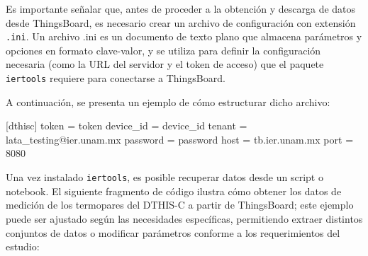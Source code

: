 \documentclass[
  letterpaper,
]{scrbook}
\newenvironment{Shaded}{\begin{snugshade}}{\end{snugshade}}
\newcommand{\DecValTok}[1]{\textcolor[rgb]{0.68,0.00,0.00}{#1}}
\newcommand{\NormalTok}[1]{\textcolor[rgb]{0.00,0.23,0.31}{#1}}
\newcommand{\OperatorTok}[1]{\textcolor[rgb]{0.37,0.37,0.37}{#1}}
\begin{document}
Es importante señalar que, antes de proceder a la obtención y descarga
de datos desde ThingsBoard, es necesario crear un archivo de
configuración con extensión \texttt{.ini}. Un archivo .ini es un
documento de texto plano que almacena parámetros y opciones en formato
clave-valor, y se utiliza para definir la configuración necesaria (como
la URL del servidor y el token de acceso) que el paquete
\texttt{iertools} requiere para conectarse a ThingsBoard.

A continuación, se presenta un ejemplo de cómo estructurar dicho
archivo:

\begin{Shaded}
\begin{Highlighting}[]
\NormalTok{[dthisc]}
\NormalTok{token     }\OperatorTok{=}\NormalTok{ token}
\NormalTok{device\_id }\OperatorTok{=}\NormalTok{ device\_id}
\NormalTok{tenant    }\OperatorTok{=}\NormalTok{ lata\_testing}\OperatorTok{@}\NormalTok{ier.unam.mx}
\NormalTok{password  }\OperatorTok{=}\NormalTok{ password}
\NormalTok{host      }\OperatorTok{=}\NormalTok{ tb.ier.unam.mx}
\NormalTok{port      }\OperatorTok{=} \DecValTok{8080} 
\end{Highlighting}
\end{Shaded}

Una vez instalado \texttt{iertools}, es posible recuperar datos desde un
script o notebook. El siguiente fragmento de código ilustra cómo obtener
los datos de medición de los termopares del DTHIS-C a partir de
ThingsBoard; este ejemplo puede ser ajustado según las necesidades
específicas, permitiendo extraer distintos conjuntos de datos o
modificar parámetros conforme a los requerimientos del estudio:
\end{document}
